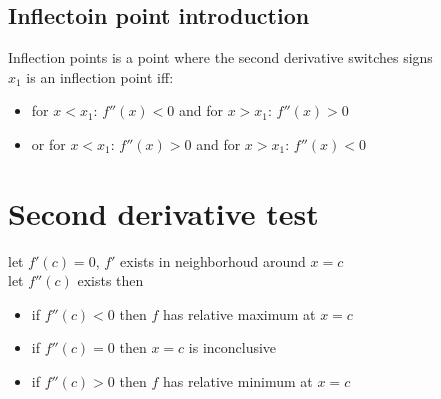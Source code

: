\documentclass{article}
\begin{document}
        \subsection{Inflectoin point introduction}
            Inflection points is a point where the second derivative switches signs \\
            \(x_1\) is an inflection point iff: 
            \begin{itemize}
                \item for \(x < x_1 \): \(f''(x) < 0\) and for \(x > x_1\): \(f''(x) > 0\)
                \item or for \(x < x_1 \): \(f''(x) > 0\) and for \(x > x_1\): \(f''(x) < 0\) 
            \end{itemize}
\section{Second derivative test}
            let \(f'(c) = 0\), \(f'\) exists in neighborhoud around \( x = c\) \\ 
            let \(f''(c)\) exists then \\
            \begin{itemize}
                \item if \(f''(c) < 0\) then \(f\) has  relative maximum at \(x = c\)
                \item if \(f''(c) = 0\) then \(x = c\) is inconclusive 
                \item if \(f''(c) > 0\) then \(f\) has  relative minimum at \(x = c\)
            \end{itemize}
            
            
\end{document}
